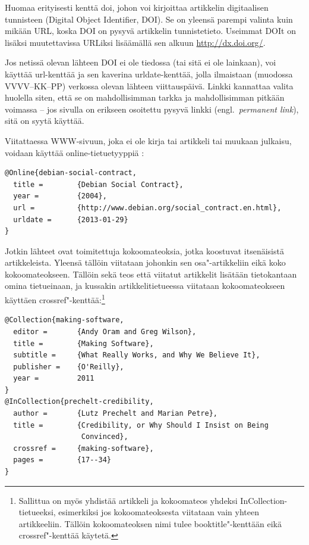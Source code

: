 \documentclass[utf8]{gradu3-tjt}
\begin{document}
Huomaa erityisesti kenttä doi, johon voi kirjoittaa artikkelin
digitaalisen tunnisteen (Digital Object Identifier, DOI).  Se on
yleensä parempi valinta kuin mikään URL, koska DOI on pysyvä
artikkelin tunnistetieto.  Useimmat DOIt on lisäksi muutettavissa
URLiksi lisäämällä sen alkuun \url{http://dx.doi.org/}.

Jos netissä olevan lähteen DOI ei ole tiedossa (tai sitä ei ole
lainkaan), voi käyttää url-kenttää ja sen kaverina urldate-kenttää,
jolla ilmaistaan (muodossa VVVV--KK--PP) verkossa olevan lähteen
viittauspäivä.  Linkki kannattaa valita huolella siten, että se on
mahdollisimman tarkka ja mahdollisimman pitkään voimassa -- jos
sivulla on erikseen osoitettu pysyvä linkki (engl.~\emph{permanent
  link}), sitä on syytä käyttää.

Viitattaessa WWW-sivuun, joka ei ole kirja tai artikkeli tai muukaan
julkaisu, voidaan käyttää
online-tietuetyyppiä \parencite[esim.][]{debian-social-contract}:

\begingroup\footnotesize
\begin{verbatim}
@Online{debian-social-contract,
  title =        {Debian Social Contract},
  year =         {2004},
  url =          {http://www.debian.org/social_contract.en.html},
  urldate =      {2013-01-29}
}
\end{verbatim}
\endgroup

Jotkin lähteet ovat toimitettuja kokoomateoksia, jotka koostuvat
itsenäisistä artikkeleista.  Yleensä tällöin viitataan johonkin sen
osa"-artikkeliin \parencite[esim.][]{prechelt-credibility} eikä koko
kokoomateokseen.  Tällöin sekä teos että viitatut artikkelit lisätään
tietokantaan omina tietueinaan, ja kussakin artikkelitietueessa
viitataan kokoomateokseen käyttäen
crossref"-kenttää:\footnote{Sallittua on myös yhdistää artikkeli ja
  kokoomateos yhdeksi InCollection-tietueeksi, esimerkiksi jos
  kokoomateoksesta viitataan vain yhteen artikkeeliin.  Tällöin
  kokoomateoksen nimi tulee booktitle"-kenttään eikä crossref"-kenttää
  käytetä.}

\begingroup\footnotesize
\begin{verbatim}
@Collection{making-software,
  editor =       {Andy Oram and Greg Wilson},
  title =        {Making Software},
  subtitle =     {What Really Works, and Why We Believe It},
  publisher =    {O'Reilly},
  year =         2011
}
@InCollection{prechelt-credibility,
  author =       {Lutz Prechelt and Marian Petre},
  title =        {Credibility, or Why Should I Insist on Being
                  Convinced},
  crossref =     {making-software},
  pages =        {17--34}
}
\end{verbatim}
\endgroup
\end{document}
